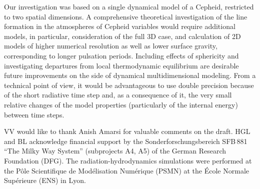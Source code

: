 \documentclass{aa}
\begin{document}
Our investigation was based on a single dynamical model of a Cepheid,
restricted to two spatial dimensions. A comprehensive theoretical
investigation of the line formation in the atmospheres of Cepheid variables would
require additional models,  in particular,
consideration of the full 3D case, and calculation of
2D models of higher numerical resolution  as well as  lower surface gravity, 
corresponding to longer pulsation periods.  
Including effects of
sphericity and investigating departures from local thermodynamic
equilibrium are desirable future improvements on the side of dynamical
multidimensional modeling. 
From a technical point of view, it would  be advantageous to use double precision 
because of the short radiative time step and, as a consequence of it, 
the  very small relative changes of the  model properties 
(particularly of  the internal energy) between time steps.

\begin{acknowledgements}
VV would like to thank Anish Amarsi for valuable comments on the draft.
HGL and BL acknowledge financial support by the Sonderforschungsbereich
SFB\,881 ``The Milky Way System'' (subprojects A4, A5) of the German Research
Foundation (DFG). The radiation-hydrodynamics simulations were performed at the
P{\^o}le Scientifique de Mod{\'e}lisation Num{\'e}rique (PSMN)
at the {\'E}cole Normale Sup{\'e}rieure (ENS) in Lyon.
\end{acknowledgements}

 
 
\end{document}
